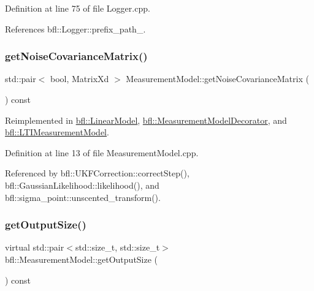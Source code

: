 Definition at line 75 of file Logger.\+cpp.



References bfl\+::\+Logger\+::prefix\+\_\+path\+\_\+.

\mbox{\label{classbfl_1_1MeasurementModel_af25f42076b69e0c6cab47d36d796536f}} 
\subsubsection{\texorpdfstring{get\+Noise\+Covariance\+Matrix()}{getNoiseCovarianceMatrix()}}
{\footnotesize\ttfamily std\+::pair$<$ bool, Matrix\+Xd $>$ Measurement\+Model\+::get\+Noise\+Covariance\+Matrix (\begin{DoxyParamCaption}{ }\end{DoxyParamCaption}) const\hspace{0.3cm}{\ttfamily [virtual]}}



Reimplemented in \mbox{\hyperlink{classbfl_1_1LinearModel_a9adc7aabd58e79ce71c283866ddbf655}{bfl\+::\+Linear\+Model}}, \mbox{\hyperlink{classbfl_1_1MeasurementModelDecorator_a690917b537b72bd6278968bbd5b030b0}{bfl\+::\+Measurement\+Model\+Decorator}}, and \mbox{\hyperlink{classbfl_1_1LTIMeasurementModel_a227ed150a9fdcb2b5b59f7b71eb7e462}{bfl\+::\+L\+T\+I\+Measurement\+Model}}.



Definition at line 13 of file Measurement\+Model.\+cpp.



Referenced by bfl\+::\+U\+K\+F\+Correction\+::correct\+Step(), bfl\+::\+Gaussian\+Likelihood\+::likelihood(), and bfl\+::sigma\+\_\+point\+::unscented\+\_\+transform().

\mbox{\label{classbfl_1_1MeasurementModel_a6cca2022b576c9dbb61e73b83a10c6ee}} 
\subsubsection{\texorpdfstring{get\+Output\+Size()}{getOutputSize()}}
{\footnotesize\ttfamily virtual std\+::pair$<$std\+::size\+\_\+t, std\+::size\+\_\+t$>$ bfl\+::\+Measurement\+Model\+::get\+Output\+Size (\begin{DoxyParamCaption}{ }\end{DoxyParamCaption}) const\hspace{0.3cm}{\ttfamily [pure virtual]}}



